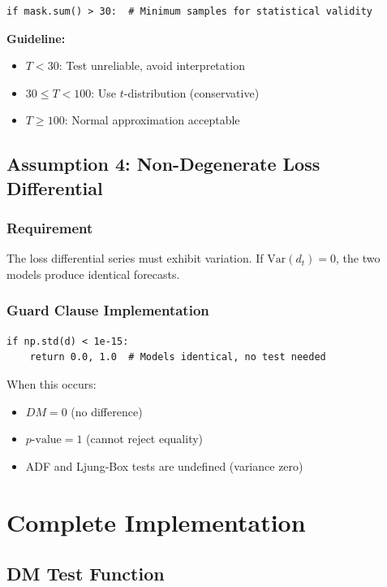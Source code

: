 \documentclass[11pt,a4paper]{article}
\begin{document}
\begin{lstlisting}
if mask.sum() > 30:  # Minimum samples for statistical validity
\end{lstlisting}

\textbf{Guideline:}
\begin{itemize}
    \item $T < 30$: Test unreliable, avoid interpretation
    \item $30 \leq T < 100$: Use $t$-distribution (conservative)
    \item $T \geq 100$: Normal approximation acceptable
\end{itemize}

\subsection{Assumption 4: Non-Degenerate Loss Differential}

\subsubsection*{Requirement}

The loss differential series must exhibit variation. If $\text{Var}(d_t) = 0$, the two models produce identical forecasts.

\subsubsection*{Guard Clause Implementation}

\begin{lstlisting}
if np.std(d) < 1e-15:
    return 0.0, 1.0  # Models identical, no test needed
\end{lstlisting}

When this occurs:
\begin{itemize}
    \item $DM = 0$ (no difference)
    \item $p\text{-value} = 1$ (cannot reject equality)
    \item ADF and Ljung-Box tests are undefined (variance zero)
\end{itemize}

\section{Complete Implementation}

\subsection{DM Test Function}
\end{document}

